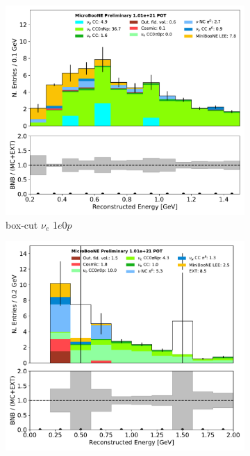 \begin{figure}[ht] 
\begin{center}
    \begin{subfigure}[b]{0.28\textwidth}
    \centering
    \includegraphics[width=1.00\textwidth]{1eNp/reco_e_01162020_box_RUN1.pdf}
    \caption{\label{fig:intro:nueselections:1eNp} box-cut $\nu_e$ 1$e$0$p$}
    \end{subfigure}
    \begin{subfigure}[b]{0.28\textwidth}
    \centering
    \includegraphics[width=1.00\textwidth]{1e0p/reco_e_01162020_RUN3_bgbdt.pdf}

\end{subfigure}
\end{center}
\end{figure}
